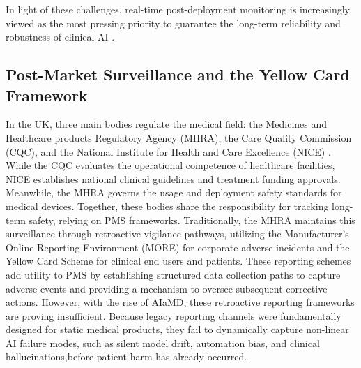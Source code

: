 \documentclass[11pt,a4paper]{article}
\begin{document}
In light of these challenges, real-time post-deployment monitoring is increasingly viewed as the most pressing priority to guarantee the long-term reliability and robustness of clinical AI \cite{guan2026} .




\subsection{Post-Market Surveillance and the Yellow Card Framework}
\label{sec:Post-Market Surveillance and the Yellow Card Framework}

In the UK, three main bodies regulate the medical field: the Medicines and Healthcare products Regulatory Agency (MHRA), the Care Quality Commission (CQC), and the National Institute for Health and Care Excellence (NICE) \cite{vention2026UKhealthcare} . While the CQC evaluates the operational competence of healthcare facilities, NICE establishes national clinical guidelines and treatment funding approvals. Meanwhile, the MHRA governs the usage and deployment safety standards for medical devices. Together, these bodies share the responsibility for tracking long-term safety, relying on PMS frameworks. Traditionally, the MHRA maintains this surveillance through retroactive vigilance pathways, utilizing the Manufacturer’s Online Reporting Environment (MORE) for corporate adverse incidents and the Yellow Card Scheme for clinical end users and patients. These reporting schemes add utility to PMS by establishing structured data collection paths to capture adverse events and providing a mechanism to oversee subsequent corrective actions. However, with the rise of AIaMD, these retroactive reporting frameworks are proving insufficient. Because legacy reporting channels were fundamentally designed for static medical products, they fail to dynamically capture non-linear AI failure modes, such as silent model drift, automation bias, and clinical hallucinations,before patient harm has already occurred.
\end{document}
